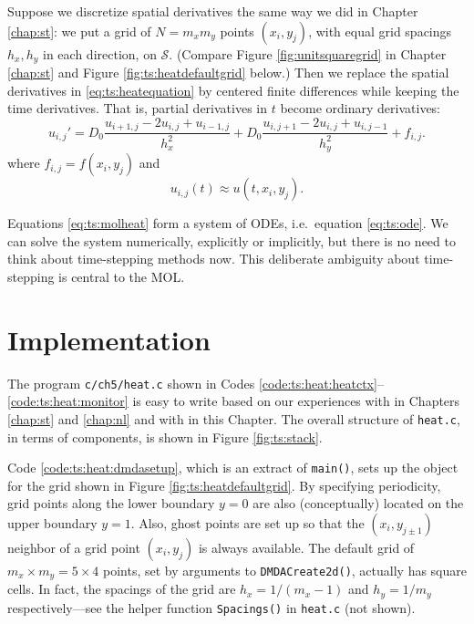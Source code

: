 Suppose we discretize spatial derivatives the same way we did in Chapter \ref{chap:st}: we put a grid of $N = m_x m_y$ points $(x_i,y_j)$, with equal grid spacings $h_x,h_y$ in each direction, on $\mathcal{S}$.  (Compare Figure \ref{fig:unitsquaregrid} in Chapter \ref{chap:st} and Figure \ref{fig:ts:heatdefaultgrid} below.)  Then we replace the spatial derivatives in \eqref{eq:ts:heatequation} by centered finite differences while keeping the time derivatives.  That is, partial derivatives in $t$ become ordinary derivatives:
\begin{equation}
u_{i,j}' = D_0 \frac{u_{i+1,j} - 2 u_{i,j} + u_{i-1,j}}{h_x^2} + D_0 \frac{u_{i,j+1} - 2 u_{i,j} + u_{i,j-1}}{h_y^2} + f_{i,j}. \label{eq:ts:molheat}
\end{equation}
where $f_{i,j} = f(x_i,y_j)$ and
\begin{equation}
u_{i,j}(t) \approx u(t,x_i,y_j). \label{eq:ts:molumeaning}
\end{equation}

Equations \eqref{eq:ts:molheat} form a system of ODEs, i.e.~equation \eqref{eq:ts:ode}.  We can solve the system numerically, explicitly or implicitly, but there is no need to think about time-stepping methods now.  This deliberate ambiguity about time-stepping is central to the MOL.


\section{Implementation}

The program \texttt{c/ch5/heat.c} shown in Codes \ref{code:ts:heat:heatctx}--\ref{code:ts:heat:monitor} is easy to write based on our experiences with \pDMDA in Chapters \ref{chap:st} and \ref{chap:nl} and with \pTS in this Chapter.   The overall structure of \texttt{heat.c}, in terms of \PETSc components, is shown in Figure \ref{fig:ts:stack}.


Code \ref{code:ts:heat:dmdasetup}, which is an extract of \texttt{main()}, sets up the \pDMDA object for the grid shown in Figure \ref{fig:ts:heatdefaultgrid}.  By specifying periodicity, grid points along the lower boundary $y=0$ are also (conceptually) located on the upper boundary $y=1$.  Also, ghost points are set up so that the $(x_i,y_{j\pm 1})$ neighbor of a grid point $(x_i,y_j)$ is always available.  The default grid of $m_x \times m_y = 5\times 4$ points, set by arguments to \texttt{DMDACreate2d()}, actually has square cells.  In fact, the spacings of the grid are $h_x=1/(m_x-1)$ and $h_y=1/m_y$ respectively---see the helper function \texttt{Spacings()} in \texttt{heat.c} (not shown).

